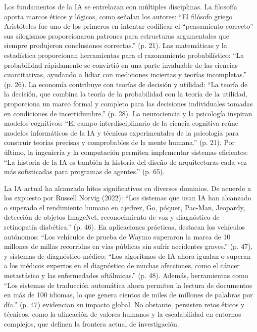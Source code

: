 Los fundamentos de la IA se entrelazan con múltiples disciplinas. La filosofía aporta marcos éticos y lógicos, como señalan los autores: ``El filósofo griego Aristóteles fue uno de los primeros en intentar codificar el ``pensamiento correcto'' sus silogismos proporcionaron patrones para estructuras argumentales que siempre produjeron conclusiones correctas.'' (p. 21). Las matemáticas y la estadística proporcionan herramientas para el razonamiento probabilístico: ``La probabilidad rápidamente se convirtió en una parte invaluable de las ciencias cuantitativas, ayudando a lidiar con mediciones inciertas y teorías incompletas.'' (p. 26). La economía contribuye con teorías de decisión y utilidad: ``La teoría de la decisión, que combina la teoría de la probabilidad con la teoría de la utilidad, proporciona un marco formal y completo para las decisiones individuales tomadas en condiciones de incertidumbre.'' (p. 28). La neurociencia y la psicología inspiran modelos cognitivos: ``El campo interdisciplinario de la ciencia cognitiva reúne modelos informáticos de la IA y técnicas experimentales de la psicología para construir teorías precisas y comprobables de la mente humana.'' (p. 21). Por último, la ingeniería y la computación permiten implementar sistemas eficientes: ``La historia de la IA es también la historia del diseño de arquitecturas cada vez más sofisticadas para programas de agentes.'' (p. 65).

La IA actual ha alcanzado hitos significativos en diversos dominios. De acuerdo a los expuesto por Russell Norvig (2022): “Los sistemas que usan IA han alcanzado o superado el rendimiento humano en ajedrez, Go, póquer, Pac-Man, Jeopardy, detección de objetos ImageNet, reconocimiento de voz y diagnóstico de retinopatía diabética.'' (p. 46). En aplicaciones prácticas, destacan los vehículos autónomos: ``Los vehículos de prueba de Waymo superaron la marca de 10 millones de millas recorridas en vías públicas sin sufrir accidentes graves.'' (p. 47), y sistemas de diagnóstico médico: ``Los algoritmos de IA ahora igualan o superan a los médicos expertos en el diagnóstico de muchas afecciones, como el cáncer metastásico y las enfermedades oftálmicas.'' (p. 48). Además, herramientas como ``Los sistemas de traducción automática ahora permiten la lectura de documentos en más de 100 idiomas, lo que genera cientos de miles de millones de palabras por día.'' (p. 47) evidencian su impacto global. No obstante, persisten retos éticos y técnicos, como la alineación de valores humanos y la escalabilidad en entornos complejos, que definen la frontera actual de investigación.

